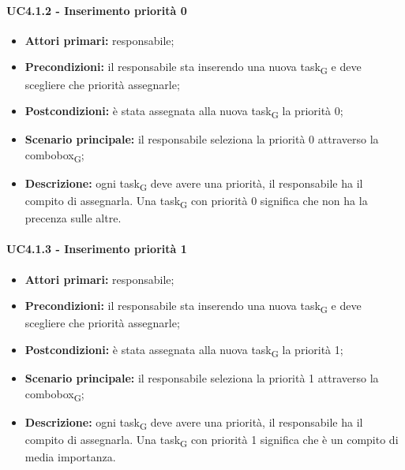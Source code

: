 \paragraph{UC4.1.2 - Inserimento priorità 0}
\begin{itemize}
	\item 	\textbf{Attori primari:} responsabile;
	\item 	\textbf{Precondizioni:} il responsabile sta inserendo una nuova task\textsubscript{G} e deve scegliere che priorità assegnarle;
	\item 	\textbf{Postcondizioni:} è stata assegnata alla nuova task\textsubscript{G} la priorità 0;
	\item 	\textbf{Scenario principale:} il responsabile seleziona la priorità 0 attraverso la combobox\textsubscript{G};
	\item 	\textbf{Descrizione:} ogni task\textsubscript{G} deve avere una priorità, il responsabile ha il compito di assegnarla. Una task\textsubscript{G} con priorità 0 significa che non ha la precenza sulle altre.	
\end{itemize}
\paragraph{UC4.1.3 - Inserimento priorità 1}
\begin{itemize}
	\item 	\textbf{Attori primari:} responsabile;
	\item 	\textbf{Precondizioni:} il responsabile sta inserendo una nuova task\textsubscript{G} e deve scegliere che priorità assegnarle;
	\item 	\textbf{Postcondizioni:} è stata assegnata alla nuova task\textsubscript{G} la priorità 1;
	\item 	\textbf{Scenario principale:} il responsabile seleziona la priorità 1 attraverso la combobox\textsubscript{G};
	\item 	\textbf{Descrizione:} ogni task\textsubscript{G} deve avere una priorità, il responsabile ha il compito di assegnarla. Una task\textsubscript{G} con priorità 1 significa che è un compito di media importanza.
	
\end{itemize}
